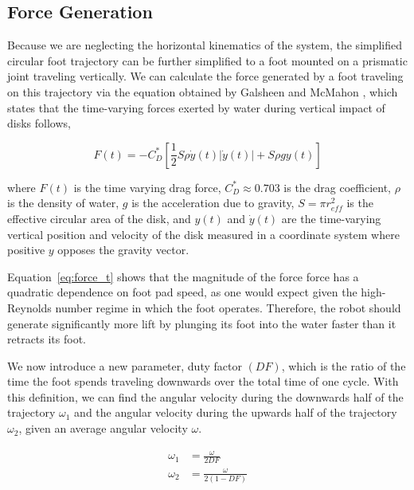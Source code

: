 \subsection{Force Generation}
Because we are neglecting the horizontal kinematics of the system, the simplified circular foot trajectory can be further simplified to a foot mounted on a prismatic joint traveling vertically. We can calculate the force generated by a foot traveling on this trajectory via the equation obtained by Galsheen and McMahon \cite{glasheen1996vertical}, which states that the time-varying forces exerted by water during vertical impact of disks follows,

\begin{equation}
	F(t) = - C_D^* \left[\frac{1}{2} S \rho \dot{y}(t) |\dot{y}(t) | + S \rho g y(t) \right]
	\label{eq:force_t}
\end{equation}

\noindent where $F(t)$ is the time varying drag force, $C_D^* \approx 0.703$ is the drag coefficient, $\rho$ is the density of water, $g$ is the acceleration due to gravity, $S = \pi r_{eff}^2$ is the effective circular area of the disk, and $y(t)$ and $\dot{y}(t)$ are the time-varying vertical position and velocity of the disk measured in a coordinate system where positive $y$ opposes the gravity vector. 

Equation~\ref{eq:force_t} shows that the magnitude of the force force has a quadratic dependence on foot pad speed, as one would expect given the high-Reynolds number regime in which the foot operates. Therefore, the robot should generate significantly more lift by plunging its foot into the water faster than it retracts its foot.

We now introduce a new parameter, duty factor $(DF)$, which is the ratio of the time the foot spends traveling downwards over the total time of one cycle. With this definition, we can find the angular velocity during the downwards half of the trajectory $\omega_1$ and the angular velocity during the upwards half of the trajectory $\omega_2$, given an average angular velocity $\omega$.

\begin{align}
	\omega_1 &= \frac{\omega}{2 DF} \\
	\omega_2 &= \frac{\omega}{2 (1 - DF)}
\end{align}

